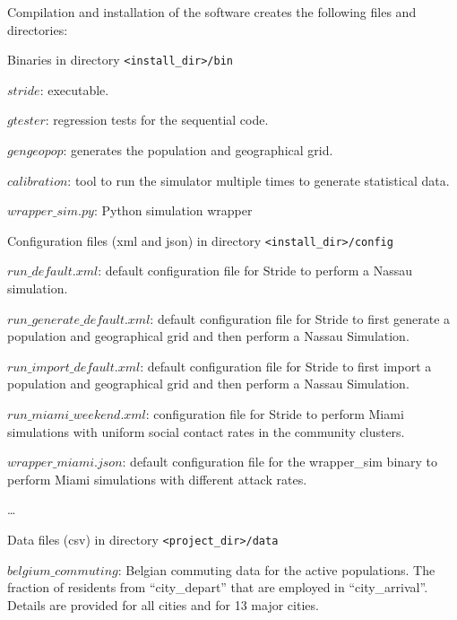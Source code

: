 Compilation and installation of the software creates the following files and directories:
\begin{compactitem}
%
	\item Binaries in directory \texttt{<install\_dir>/bin}
      		\begin{compactitem}
        			\item $stride$: executable.
        			\item $gtester$: regression tests for the sequential code.
               	 \item $gengeopop$: generates the population and geographical grid.
                	\item $calibration$: tool to run the simulator multiple times to generate statistical data. 
        			\item $wrapper\_sim.py$: Python simulation wrapper
        	\end{compactitem}
%
    \item Configuration files (xml and json) in directory \texttt{<install\_dir>/config}
      	\begin{compactitem}
			\item $run\_default.xml$: default configuration file for Stride to perform a Nassau simulation.
        		\item $run\_generate\_default.xml$: default configuration file for Stride to first generate a population and geographical grid and then perform a Nassau Simulation.
       		\item $run\_import\_default.xml$: default configuration file for Stride to first import a population and geographical grid and then perform a Nassau Simulation.
        		\item $run\_miami\_weekend.xml$: configuration file for Stride to perform Miami simulations with uniform social contact rates in the community clusters.
			\item $wrapper\_miami.json$: default configuration file for the wrapper\_sim binary to perform Miami simulations with different attack rates.
        		\item \ldots
        \end{compactitem}
%        
    \item Data files (csv) in directory \texttt{<project\_dir>/data}
      	\begin{compactitem}
        		\item $belgium\_commuting$: Belgian commuting data for the active populations. The fraction of residents from ``city\_depart'' that are employed in ``city\_arrival''. Details are provided for all cities and for 13 major cities.

\end{compactitem}
\end{compactitem}
